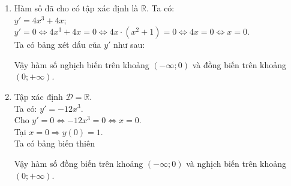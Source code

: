 \begin{bt}
{\begin{enumerate}
\begin{center}
            \end{center}
            Vậy hàm số nghịch biến trên $(-\infty;-1)$, $(0;1)$; đồng biến trên $(-1 ; 0)$, $(1;+\infty)$.
            \item %
            Hàm số đã cho có tập xác định là $\mathbb{R}$.
            Ta có:\\
            $y'=4x^3+4x$;\\
            $y'=0\Leftrightarrow 4x^3+4x=0 \Leftrightarrow 4x\cdot \left(x^2+1\right)=0\Leftrightarrow 4x=0\Leftrightarrow x=0$.\\
            Ta có bảng xét dấu của $y'$ như sau:
            \begin{center}
            \end{center}
            Vậy hàm số nghịch biến trên khoảng $\left(-\infty;0\right)$ và đồng biến trên khoảng $\left(0;+\infty\right)$.
            \item %
            Tập xác định $\mathscr{D}=\mathbb{R}$.\\
            Ta có: $y'=-12x^3$.\\
            Cho $y'=0 \Leftrightarrow -12x^3 = 0 \Leftrightarrow x=0$.\\
            Tại $x=0 \Rightarrow y(0)=1$.\\
            Ta có bảng biến thiên
            \begin{center}
            \end{center}
            Vậy hàm số đồng biến trên khoảng $\left(-\infty;0\right)$ và nghịch biến trên khoảng $\left(0;+\infty\right)$.
        \end{enumerate}
    }
\end{bt}
